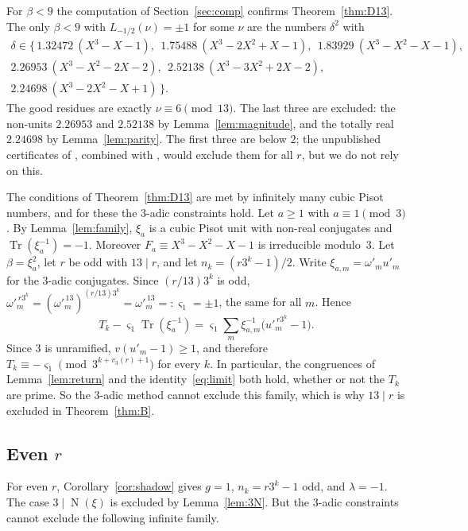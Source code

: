 \documentclass[11pt,a4paper]{article}
\theoremstyle{definition}
\theoremstyle{remark}
\DeclareMathOperator{\Tr}{Tr}
\DeclareMathOperator{\Nm}{N}
\begin{document}
For $\beta<9$ the computation of Section~\ref{sec:comp} confirms Theorem~\ref{thm:D13}.
The only $\beta<9$ with $L_{-1/2}(\nu)=\pm1$ for some $\nu$ are the numbers $\delta^2$ with
\[
\begin{gathered}
\delta\in\{\,1.32472\ (X^3-X-1),\ \ 1.75488\ (X^3-2X^2+X-1),\ \ 1.83929\ (X^3-X^2-X-1),\\
2.26953\ (X^3-X^2-2X-2),\ \ 2.52138\ (X^3-3X^2+2X-2),\\ 2.24698\ (X^3-2X^2-X+1)\,\}.
\end{gathered}
\]
The good residues are exactly $\nu\equiv6\pmod{13}$.
The last three are excluded: the non-units $2.26953$ and $2.52138$ by Lemma~\ref{lem:magnitude}, and the totally real $2.24698$ by Lemma~\ref{lem:parity}.
The first three are below $2$; the unpublished certificates of \cite{K031}, combined with \cite[Corollary~2.7]{SaiVar}, would exclude them for all $r$, but we do not rely on this.

The conditions of Theorem~\ref{thm:D13} are met by infinitely many cubic Pisot numbers, and for these the $3$-adic constraints hold.
Let $a\ge1$ with $a\equiv1\pmod3$. By Lemma~\ref{lem:family}, $\xi_a$ is a cubic Pisot unit with non-real conjugates and $\Tr(\xi_a^{-1})=-1$. Moreover $F_a\equiv X^3-X^2-X-1$ is irreducible modulo~$3$.
Let $\beta=\xi_a^2$, let $r$ be odd with $13\mid r$, and let $n_k=(r3^k-1)/2$.
Write $\xi_{a,m}=\omega'_mu'_m$ for the $3$-adic conjugates. Since $(r/13)3^k$ is odd, $\omega'^{\,r3^k}_m=(\omega'^{\,13}_m)^{(r/13)3^k}=\omega'^{\,13}_m=:\varsigma_1=\pm1$, the same for all $m$. Hence
\[
 T_k-\varsigma_1\Tr(\xi_a^{-1})=\varsigma_1\sum_m\xi_{a,m}^{-1}\bigl(u'^{\,r3^k}_m-1\bigr).
\]
Since $3$ is unramified, $v(u'_m-1)\ge1$, and therefore $T_k\equiv-\varsigma_1\pmod{3^{k+v_3(r)+1}}$ for every $k$.
In particular, the congruences of Lemma~\ref{lem:return} and the identity~\eqref{eq:limit} both hold, whether or not the $T_k$ are prime.
So the $3$-adic method cannot exclude this family, which is why $13\mid r$ is excluded in Theorem~\ref{thm:B}.

\subsection{Even $r$}
For even $r$, Corollary~\ref{cor:shadow} gives $g=1$, $n_k=r3^k-1$ odd, and $\lambda=-1$.
The case $3\mid\Nm(\xi)$ is excluded by Lemma~\ref{lem:3N}.
But the $3$-adic constraints cannot exclude the following infinite family.
\end{document}
